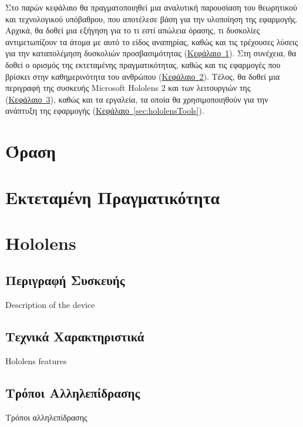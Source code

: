 
Στο παρών κεφάλαιο θα πραγματοποιηθεί μια αναλυτική παρουσίαση του θεωρητικού και τεχνολογικού υπόβαθρου, που αποτέλεσε βάση για την υλοποίηση της εφαρμογής. Αρχικά, θα δοθεί μια εξήγηση για το τι εστί απώλεια όρασης, τι δυσκολίες αντιμετωπίζουν τα άτομα με αυτό το είδος αναπηρίας, καθώς και τις τρέχουσες λύσεις για την καταπολέμηση δυσκολιών προσβασιμότητας (\hyperref[sec:visualImpairment]{Κεφάλαιο~\ref*{sec:visualImpairment}}). Στη συνέχεια, θα δοθεί ο ορισμός της εκτεταμένης πραγματικότητας, καθώς και τις εφαρμογές που βρίσκει στην καθημερινότητα του ανθρώπου (\hyperref[sec:extendedReality]{Κεφάλαιο~\ref*{sec:extendedReality}}). Τέλος, θα δοθεί μια περιγραφή της συσκευής Microsoft Hololens 2 και των λειτουργιών της (\hyperref[sec:hololensDesc]{Κεφάλαιο~\ref*{sec:hololensDesc}}), καθώς και τα εργαλεία, τα οποία θα χρησιμοποιηθούν για την ανάπτυξη της εφαρμογής (\hyperref[sec:hololensTools]{Κεφάλαιο~\ref*{sec:hololensTools}}).

\section{Όραση}\label{sec:visualImpairment}



\section{Εκτεταμένη Πραγματικότητα}\label{sec:extendedReality}



\section{Hololens}\label{sec:hololensDesc}

\subsection{Περιγραφή Συσκευής}
Description of the device

\subsection{Τεχνικά Χαρακτηριστικά}
Hololens features

\subsection{Τρόποι Αλληλεπίδρασης}
Τρόποι αλληλεπίδρασης

